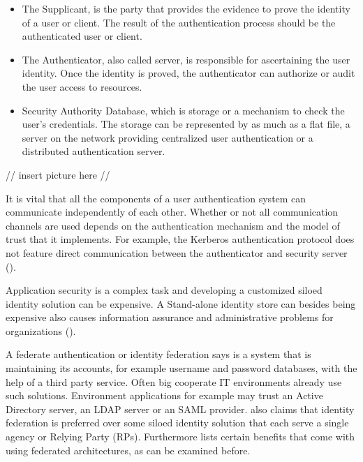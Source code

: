  \begin{itemize}
 \item The Supplicant, is the party that provides the evidence to prove the identity of a user or client. The result of the authentication process should be the authenticated user or client.  
 \item The Authenticator, also called server, is responsible for ascertaining the user identity. Once the identity is proved, the authenticator can authorize or audit the user access to resources. 
 \item Security Authority Database, which is storage or  a mechanism to check the user's credentials. The storage can be represented by as much as a flat file, a server on the network providing centralized user authentication or a distributed authentication server. 
\end{itemize}

//
insert picture here
//

It is vital that all the components of a user authentication system can communicate independently of each other. Whether or not all communication channels are used depends on the authentication mechanism and the model of trust that it implements. For example, the Kerberos authentication protocol does not feature direct communication between the authenticator and security server (\cite{Todorov:2007:MUI}). 

Application security is a complex task and developing a customized siloed identity solution can be expensive. A Stand-alone identity store can besides being expensive also causes information assurance and administrative problems for organizations (\cite{JerichoSystems:IS}). 

  A federate authentication or identity federation says \cite{Boyed:2012:GSOA} is a system that is maintaining its accounts, for example username and password databases, with the help of a third party service. Often big cooperate IT environments already use such solutions. Environment applications for example may trust an Active Directory server, an LDAP server or an SAML provider.    \cite{NIST:2017:DIG} also claims that identity federation is preferred over some siloed identity solution that each serve a single agency or Relying Party (RPs). Furthermore \cite{NIST:2017:DIG} lists certain benefits that come with using federated architectures, as can be examined before. 

